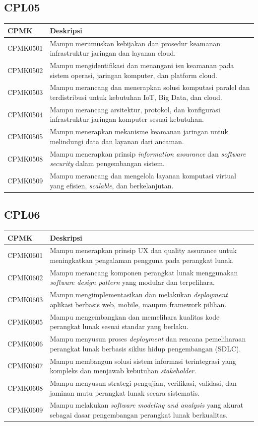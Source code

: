 \subsection{CPL05}
\begin{longtable}{L{2cm}L{12cm}}
\toprule
CPMK & Deskripsi \\
\midrule
\endhead
CPMK0501 & Mampu merumuskan kebijakan dan prosedur keamanan infrastruktur jaringan dan layanan cloud. \\
CPMK0502 & Mampu mengidentifikasi dan menangani isu keamanan pada sistem operasi, jaringan komputer, dan platform cloud. \\
CPMK0503 & Mampu merancang dan menerapkan solusi komputasi paralel dan terdistribusi untuk kebutuhan IoT, Big Data, dan cloud. \\
CPMK0504 & Mampu merancang arsitektur, protokol, dan konfigurasi infrastruktur jaringan komputer sesuai kebutuhan. \\
CPMK0505 & Mampu menerapkan mekanisme keamanan jaringan untuk melindungi data dan layanan dari ancaman. \\
CPMK0508 & Mampu menerapkan prinsip \textit{information assurance} dan \textit{software security} dalam pengembangan sistem. \\
CPMK0509 & Mampu merancang dan mengelola layanan komputasi virtual yang efisien, \textit{scalable}, dan berkelanjutan. \\
\bottomrule
\end{longtable}

\subsection{CPL06}
\begin{longtable}{L{2cm}L{12cm}}
\toprule
CPMK & Deskripsi \\
\midrule
\endhead
CPMK0601 & Mampu menerapkan prinsip UX dan quality assurance untuk meningkatkan pengalaman pengguna pada perangkat lunak. \\
CPMK0602 & Mampu merancang komponen perangkat lunak menggunakan \textit{software design pattern} yang modular dan terpelihara. \\
CPMK0603 & Mampu mengimplementasikan dan melakukan \textit{deployment} aplikasi berbasis web, mobile, maupun framework pilihan. \\
CPMK0605 & Mampu mengembangkan dan memelihara kualitas kode perangkat lunak sesuai standar yang berlaku. \\
CPMK0606 & Mampu menyusun proses \textit{deployment} dan rencana pemeliharaan perangkat lunak berbasis siklus hidup pengembangan (SDLC). \\
CPMK0607 & Mampu membangun solusi sistem informasi terintegrasi yang kompleks dan menjawab kebutuhan \textit{stakeholder}. \\
CPMK0608 & Mampu menyusun strategi pengujian, verifikasi, validasi, dan jaminan mutu perangkat lunak secara sistematis. \\
CPMK0609 & Mampu melakukan \textit{software modeling and analysis} yang akurat sebagai dasar pengembangan perangkat lunak berkualitas. \\
\bottomrule
\end{longtable}

